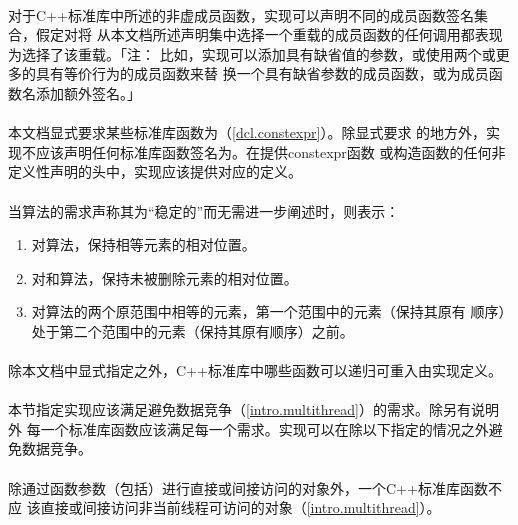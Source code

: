 \paragraph{}
对于C++标准库中所述的非虚成员函数，实现可以声明不同的成员函数签名集合，假定对将
从本文档所述声明集中选择一个重载的成员函数的任何调用都表现为选择了该重载。「注：
比如，实现可以添加具有缺省值的参数，或使用两个或更多的具有等价行为的成员函数来替
换一个具有缺省参数的成员函数，或为成员函数名添加额外签名。」

\paragraph{}
本文档显式要求某些标准库函数为（\ref{dcl.constexpr}）。除显式要求
的地方外，实现不应该声明任何标准库函数签名为。在提供constexpr函数
或构造函数的任何非定义性声明的头中，实现应该提供对应的定义。

\paragraph{}
当算法的需求声称其为“稳定的”而无需进一步阐述时，则表示：
\begin{enumerate}
  \item{对算法，保持相等元素的相对位置。}
  \item{对和算法，保持未被删除元素的相对位置。}
  \item{对算法的两个原范围中相等的元素，第一个范围中的元素（保持其原有
    顺序）处于第二个范围中的元素（保持其原有顺序）之前。}
\end{enumerate}

\paragraph{}
除本文档中显式指定之外，C++标准库中哪些函数可以递归可重入由实现定义。

\paragraph{}
本节指定实现应该满足避免数据竞争（\ref{intro.multithread}）的需求。除另有说明外
每一个标准库函数应该满足每一个需求。实现可以在除以下指定的情况之外避免数据竞争。

\paragraph{}
除通过函数参数（包括）进行直接或间接访问的对象外，一个C++标准库函数不应
该直接或间接访问非当前线程可访问的对象（\ref{intro.multithread}）。

